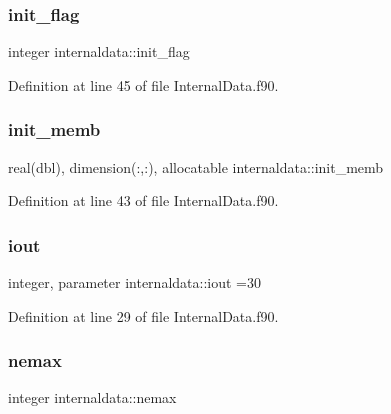 \mbox{\label{namespaceinternaldata_accc2e120df220e17a9e2b6cc72e42793}} 
\subsubsection{\texorpdfstring{init\+\_\+flag}{init\_flag}}
{\footnotesize\ttfamily integer internaldata\+::init\+\_\+flag}



Definition at line 45 of file Internal\+Data.\+f90.

\mbox{\label{namespaceinternaldata_a187a3d4ecc99e732bd15234944dae732}} 
\subsubsection{\texorpdfstring{init\+\_\+memb}{init\_memb}}
{\footnotesize\ttfamily real(dbl), dimension(\+:,\+:), allocatable internaldata\+::init\+\_\+memb}



Definition at line 43 of file Internal\+Data.\+f90.

\mbox{\label{namespaceinternaldata_a82858bed9f1804b4d9d545add41703b8}} 
\subsubsection{\texorpdfstring{iout}{iout}}
{\footnotesize\ttfamily integer, parameter internaldata\+::iout =30}



Definition at line 29 of file Internal\+Data.\+f90.

\mbox{\label{namespaceinternaldata_a9f8cf693f79f58344704c979aa5168c4}} 
\subsubsection{\texorpdfstring{nemax}{nemax}}
{\footnotesize\ttfamily integer internaldata\+::nemax}



